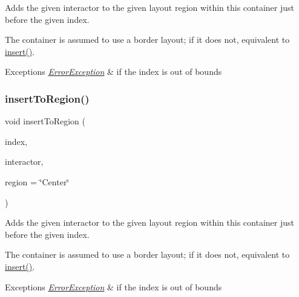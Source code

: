 Adds the given interactor to the given layout region within this container just before the given index. 

The container is assumed to use a border layout; if it does not, equivalent to \mbox{\hyperlink{classGContainer_afffb8f789ff9a8466fbae5b846a0ebe7}{insert()}}. 
\begin{DoxyExceptions}{Exceptions}
{\em \mbox{\hyperlink{classErrorException}{Error\+Exception}}} & if the index is out of bounds \\
\hline
\end{DoxyExceptions}
\mbox{\label{classGContainer_ad4d413f64a3e4fb948956e7249c10110}} 
\subsubsection{\texorpdfstring{insert\+To\+Region()}{insertToRegion()}\hspace{0.1cm}{\footnotesize\ttfamily [4/4]}}
{\footnotesize\ttfamily void insert\+To\+Region (\begin{DoxyParamCaption}\item[{int}]{index,  }\item[{\mbox{\hyperlink{classGInteractor}{G\+Interactor}} \&}]{interactor,  }\item[{const std\+::string \&}]{region = {\ttfamily \char`\"{}Center\char`\"{}} }\end{DoxyParamCaption})\hspace{0.3cm}{\ttfamily [virtual]}}



Adds the given interactor to the given layout region within this container just before the given index. 

The container is assumed to use a border layout; if it does not, equivalent to \mbox{\hyperlink{classGContainer_afffb8f789ff9a8466fbae5b846a0ebe7}{insert()}}. 
\begin{DoxyExceptions}{Exceptions}
{\em \mbox{\hyperlink{classErrorException}{Error\+Exception}}} & if the index is out of bounds \\
\hline
\end{DoxyExceptions}
\mbox{\label{classGObservable_aeec1adc19aa0f33de62390686ee1382c}} 
